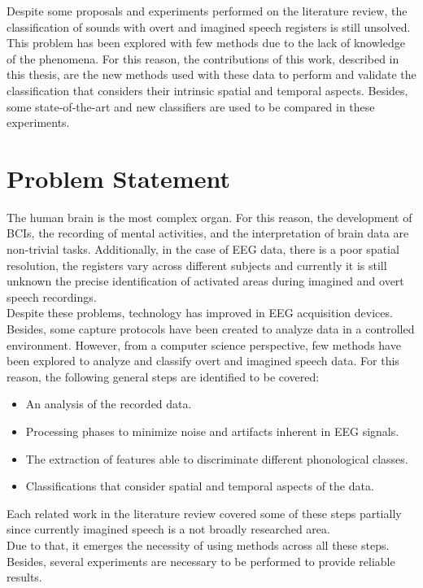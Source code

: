 Despite some proposals and experiments performed on the literature review, the classification of sounds with overt and imagined speech registers is still unsolved. This problem has been explored with few methods due to the lack of knowledge of the phenomena. For this reason, the contributions of this work, described in this thesis, are the new methods used with these data to perform and validate the classification that considers their intrinsic spatial and temporal aspects. Besides, some state-of-the-art and new classifiers are used to be compared in these experiments.

\section{Problem Statement}
The human brain is the most complex organ. For this reason, the development of BCIs, the recording of mental activities, and the interpretation of brain data are non-trivial tasks. Additionally, in the case of EEG data, there is a poor spatial resolution, the registers vary across different subjects and currently it is still unknown the precise identification of activated areas during imagined and overt speech recordings.\\

Despite these problems, technology has improved in EEG acquisition devices. Besides, some capture protocols have been created to analyze data in a controlled environment. However, from a computer science perspective, few methods have been explored to analyze and classify overt and imagined speech data. For this reason, the following general steps are identified to be covered:\\
\begin{itemize}
	\item An analysis of the recorded data.
	\item Processing phases to minimize noise and artifacts inherent in EEG signals.
	\item The extraction of features able to discriminate different phonological classes.
	\item Classifications that consider spatial and temporal aspects of the data.
\end{itemize}

Each related work in the literature review covered some of these steps partially since currently imagined speech is a not broadly researched area.\\

Due to that, it emerges the necessity of using methods across all these steps. Besides,  several experiments are necessary to be performed to provide reliable results.

